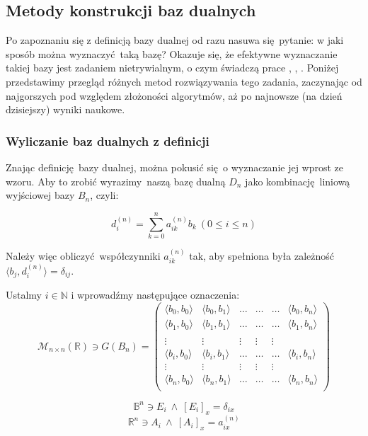 \documentclass{article}
\begin{document}
\subsection{Metody konstrukcji baz dualnych}

Po zapoznaniu się z definicją bazy dualnej od razu nasuwa się pytanie: w jaki sposób można wyznaczyć taką bazę? Okazuje się, że efektywne wyznaczanie takiej bazy jest zadaniem nietrywialnym, o czym świadczą prace \cite{PWO1}, \cite{PWO2}, \cite{PGOiPWO}. Poniżej przedstawimy przegląd różnych metod rozwiązywania tego zadania, zaczynając od najgorszych pod względem złożoności algorytmów, aż po najnowsze (na dzień dzisiejszy) wyniki naukowe. 

\subsubsection{Wyliczanie baz dualnych z definicji}

Znając definicję bazy dualnej, można pokusić się o wyznaczanie jej wprost ze wzoru. Aby to zrobić wyrazimy naszą bazę dualną $D_n$ jako kombinację liniową wyjściowej bazy $B_n$, czyli:

$$d_i^{(n)} = \sum_{k=0}^n a_{ik}^{(n)} b_k \ (0 \leq i \leq n)$$

Należy więc obliczyć współczynniki $a_{ik}^{(n)}$ tak, aby spełniona była zależność $\langle b_j, d_i^{(n)} \rangle = \delta_{ij}$.

Ustalmy $i \in \mathbb{N}$ i wprowadźmy następujące oznaczenia:
$$
\mathcal{M}_{n \times n}(\mathbb{R}) \ni G(B_n) = 
\begin{pmatrix}
\langle b_0, b_0 \rangle & \langle b_0, b_1 \rangle & \ldots & \ldots & \ldots & \langle b_0, b_n \rangle \\ 
\langle b_1, b_0 \rangle & \langle b_1, b_1 \rangle & \ldots & \ldots & \ldots & \langle b_1, b_n \rangle \\  &  &  &  & \\
\vdots & \vdots & \vdots & \vdots & \vdots \\ 
\langle b_i, b_0 \rangle & \langle b_i, b_1 \rangle & \ldots & \ldots & \ldots & \langle b_i, b_n \rangle \\ 
\vdots & \vdots & \vdots & \vdots & \vdots \\ 
\langle b_n, b_0 \rangle & \langle b_n, b_1 \rangle & \ldots & \ldots & \ldots & \langle b_n, b_n \rangle \\ 
\end{pmatrix}
$$

$$\mathbb{B}^n \ni E_i \ \wedge \ [E_i]_{x} = \delta_{ix}$$
$$\mathbb{R}^n \ni A_i \ \wedge \ [A_i]_{x} = a_{ix}^{(n)}$$
\end{document}
